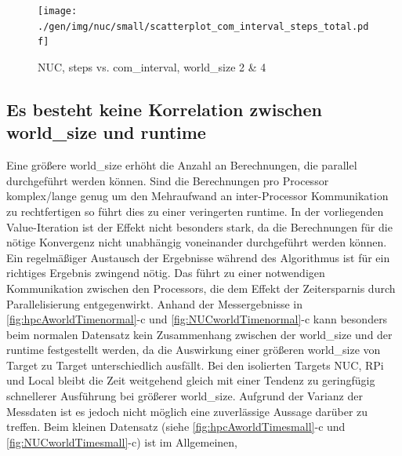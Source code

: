 \begin{figure}[h]
    \centering
    \texttt{[image: ./gen/img/nuc/small/scatterplot\_com\_interval\_steps\_total.pdf]}
    \vspace*{-2mm}
    \caption{NUC, steps vs. com\_interval, world\_size 2 \& 4}
    \label{fig:ScatStepCom}
\end{figure}

\subsection{Es besteht keine Korrelation zwischen world\_size und runtime}

Eine größere world\_size erhöht die Anzahl an Berechnungen, die parallel durchgeführt werden können. Sind die Berechnungen pro Processor komplex/lange genug um den Mehraufwand an inter-Processor Kommunikation zu rechtfertigen so führt dies zu einer veringerten runtime. In der vorliegenden Value-Iteration ist der Effekt nicht besonders stark, da die Berechnungen für die nötige Konvergenz nicht unabhängig voneinander durchgeführt werden können. Ein regelmäßiger Austausch der Ergebnisse während des Algorithmus ist für ein richtiges Ergebnis zwingend nötig. Das führt zu einer notwendigen Kommunikation zwischen den Processors,
die dem Effekt der Zeitersparnis durch Parallelisierung entgegenwirkt. Anhand der Messergebnisse in \autoref{fig:hpcAworldTimenormal}-c und \autoref{fig:NUCworldTimenormal}-c kann besonders beim normalen Datensatz kein Zusammenhang zwischen der world\_size und der runtime festgestellt werden, da die Auswirkung einer größeren world\_size von Target zu Target unterschiedlich ausfällt. Bei den isolierten Targets NUC, RPi und Local bleibt die Zeit weitgehend gleich mit einer Tendenz zu geringfügig schnellerer Ausführung bei größerer world\_size. Aufgrund der Varianz der Messdaten ist es jedoch nicht möglich eine zuverlässige Aussage darüber zu treffen. Beim kleinen Datensatz (siehe \autoref{fig:hpcAworldTimesmall}-c und \autoref{fig:NUCworldTimesmall}-c) ist im Allgemeinen,
